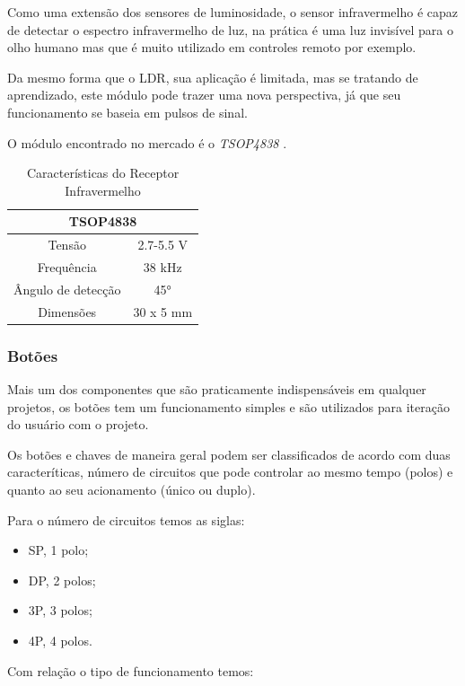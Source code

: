 Como uma extensão dos sensores de luminosidade, o sensor infravermelho é capaz de detectar o espectro infravermelho de luz, na prática é uma luz invisível para o olho humano mas que é muito utilizado em controles remoto por exemplo.

Da mesmo forma que o LDR, sua aplicação é limitada, mas se tratando de aprendizado, este módulo pode trazer uma nova perspectiva, já que seu funcionamento se baseia em pulsos de sinal.

O módulo encontrado no mercado é o \textit{TSOP4838} \cite{Semiconductors2018}.

\begin{table}[h!]
\centering
\begin{tabular}{|c|c|}
\hline
\multicolumn{2}{|c|}{TSOP4838} \\ \hline
Tensão             & 2.7-5.5 V \\ \hline
Frequência         & 38 kHz    \\ \hline
Ângulo de detecção & 45°       \\ \hline
Dimensões          & 30 x 5 mm \\ \hline
\end{tabular}
\caption{Características do Receptor Infravermelho}
\label{tab:infra}
\end{table}

\subsubsection*{Botões}

Mais um dos componentes que são praticamente indispensáveis em qualquer projetos, os botões tem um funcionamento simples e são utilizados para iteração do usuário com o projeto. 

Os botões e chaves de maneira geral podem ser classificados de acordo com duas caracteríticas, número de circuitos que pode controlar ao mesmo tempo (polos) e quanto ao seu acionamento (único ou duplo).

Para o número de circuitos temos as siglas:

\begin{itemize}
	\item SP, 1 polo;
	\item DP, 2 polos;
	\item 3P, 3 polos;
	\item 4P, 4 polos.
\end{itemize}

Com relação o tipo de funcionamento temos:

